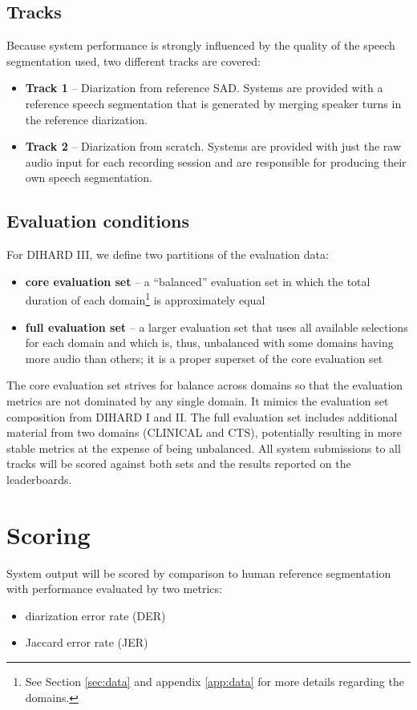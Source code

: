 \documentclass{article}
\begin{document}
\subsection{Tracks}
Because  system  performance  is  strongly  influenced  by  the  quality  of  the speech segmentation used, two different tracks are covered:
    \begin{itemize}
        \item {\bf Track 1}  --  Diarization from reference SAD. Systems are provided with a reference speech segmentation that is generated by merging speaker turns in the reference diarization.
        \item {\bf Track 2}  --  Diarization from scratch. Systems are provided with just the raw audio input for each recording session and are responsible for producing their own speech segmentation.
    \end{itemize}


\subsection{Evaluation conditions}
\label{sec:task:test}
For DIHARD III, we define two partitions of the evaluation data:
    \begin{itemize}
        \item {\bf core evaluation set}  --  a ``balanced'' evaluation set in which the total duration of each domain\footnote{See Section \ref{sec:data} and appendix \ref{app:data} for more details regarding the domains.} is approximately equal
        \item {\bf full evaluation set}  --  a larger evaluation set that uses all available selections for each domain and which is, thus, unbalanced with some domains having more audio than others; it is a proper superset of the core evaluation set
    \end{itemize}
The core evaluation set strives for balance across domains so that the evaluation metrics are not dominated by any single domain. It mimics the evaluation set composition from DIHARD I and II. The full evaluation set includes additional material from two domains (CLINICAL and CTS), potentially resulting in more stable metrics at the expense of being unbalanced. All system submissions to all tracks will be scored against both sets and the results reported on the leaderboards.

\section{Scoring}
System output will be scored by comparison to human reference segmentation with performance evaluated by two metrics:
    \begin{itemize}
        \item diarization error rate (DER)
        \item Jaccard error rate (JER) 
    \end{itemize}
\end{document}
